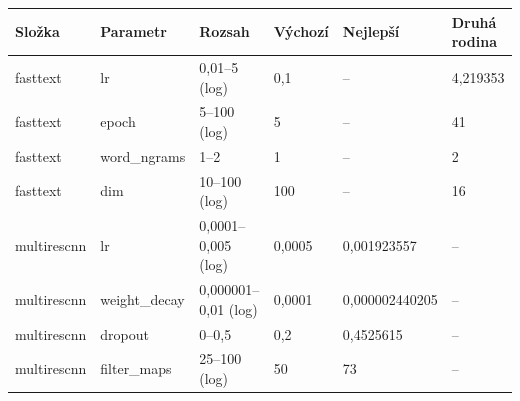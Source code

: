 \begin{tabular}{llllll}
\toprule
Složka & Parametr & Rozsah & Výchozí & Nejlepší & Druhá rodina\\
\midrule
fasttext & lr & 0,01–5 (log) & 0,1 & – & 4,219353\\
fasttext & epoch & 5–100 (log) & 5 & – & 41\\
fasttext & word\_ngrams & 1–2 & 1 & – & 2\\
fasttext & dim & 10–100 (log) & 100 & – & 16\\
multirescnn & lr & 0,0001–0,005 (log) & 0,0005 & 0,001923557 & –\\
multirescnn & weight\_decay & 0,000001–0,01 (log) & 0,0001 & 0,000002440205 & –\\
multirescnn & dropout & 0–0,5 & 0,2 & 0,4525615 & –\\
multirescnn & filter\_maps & 25–100 (log) & 50 & 73 & –\\
\bottomrule
\end{tabular}
